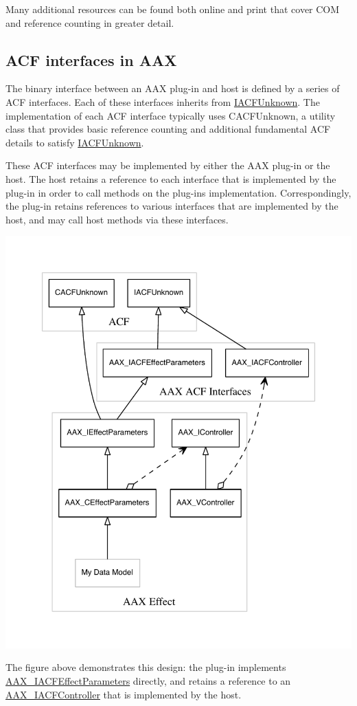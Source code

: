 Many additional resources can be found both online and print that cover C\+O\+M and reference counting in greater detail.\hypertarget{a00357_acf_in_aax}{}\subsection{A\+C\+F interfaces in A\+A\+X}\label{a00357_acf_in_aax}
The binary interface between an A\+A\+X plug-\/in and host is defined by a series of A\+C\+F interfaces. Each of these interfaces inherits from \hyperlink{a00146}{I\+A\+C\+F\+Unknown}. The implementation of each A\+C\+F interface typically uses {\ttfamily C\+A\+C\+F\+Unknown}, a utility class that provides basic reference counting and additional fundamental A\+C\+F details to satisfy \hyperlink{a00146}{I\+A\+C\+F\+Unknown}.

These A\+C\+F interfaces may be implemented by either the A\+A\+X plug-\/in or the host. The host retains a reference to each interface that is implemented by the plug-\/in in order to call methods on the plug-\/in\textquotesingle{}s implementation. Correspondingly, the plug-\/in retains references to various interfaces that are implemented by the host, and may call host methods via these interfaces.


\begin{DoxyImage}
\includegraphics[width=\textwidth,height=\textheight/2,keepaspectratio=true]{dot_aax_acf_versioning_plug-in}
\caption{A\+C\+F interfaces\+: A\+A\+X\+\_\+\+I\+A\+C\+F\+Effect\+Parameters and A\+A\+X\+\_\+\+I\+A\+C\+F\+Controller}
\end{DoxyImage}
 The figure above demonstrates this design\+: the plug-\/in implements \hyperlink{a00061}{A\+A\+X\+\_\+\+I\+A\+C\+F\+Effect\+Parameters} directly, and retains a reference to an \hyperlink{a00053}{A\+A\+X\+\_\+\+I\+A\+C\+F\+Controller} that is implemented by the host.

